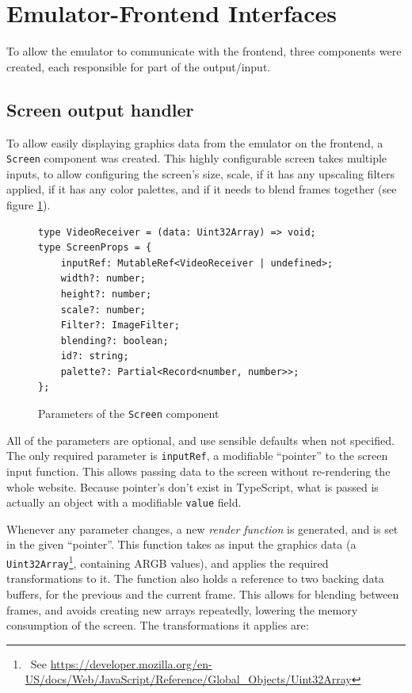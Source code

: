 \documentclass[11pt]{report}
\newcommand{\ftnt}[1]{\footnote{~See \url{#1}}}
\begin{document}
\section{Emulator-Frontend Interfaces}

To allow the emulator to communicate with the frontend, three components were created, each responsible for part of the output/input. 

\subsection{Screen output handler}

To allow easily displaying graphics data from the emulator on the frontend, a \texttt{Screen} component was created. This highly configurable screen takes multiple inputs, to allow configuring the screen's size, scale, if it has any upscaling filters applied, if it has any color palettes, and if it needs to blend frames together (see figure \ref{fig:screen-params}).

\begin{figure}[h]
    \begin{verbatim}
type VideoReceiver = (data: Uint32Array) => void;
type ScreenProps = {
    inputRef: MutableRef<VideoReceiver | undefined>;
    width?: number;
    height?: number;
    scale?: number;
    Filter?: ImageFilter;
    blending?: boolean;
    id?: string;
    palette?: Partial<Record<number, number>>;
};
    \end{verbatim}
    \caption{Parameters of the \texttt{Screen} component}
    \label{fig:screen-params}
\end{figure}

All of the parameters are optional, and use sensible defaults when not specified. The only required parameter is \texttt{inputRef}, a modifiable ``pointer'' to the screen input function. This allows passing data to the screen without re-rendering the whole website. Because pointer's don't exist in TypeScript, what is passed is actually an object with a modifiable \texttt{value} field.

Whenever any parameter changes, a new \textit{render function} is generated, and is set in the given ``pointer''. This function takes as input the graphics data (a \texttt{Uint32Array}\ftnt{https://developer.mozilla.org/en-US/docs/Web/JavaScript/Reference/Global_Objects/Uint32Array}, containing ARGB values), and applies the required transformations to it. The function also holds a reference to two backing data buffers, for the previous and the current frame. This allows for blending between frames, and avoids creating new arrays repeatedly, lowering the memory consumption of the screen. The transformations it applies are: 
\end{document}
